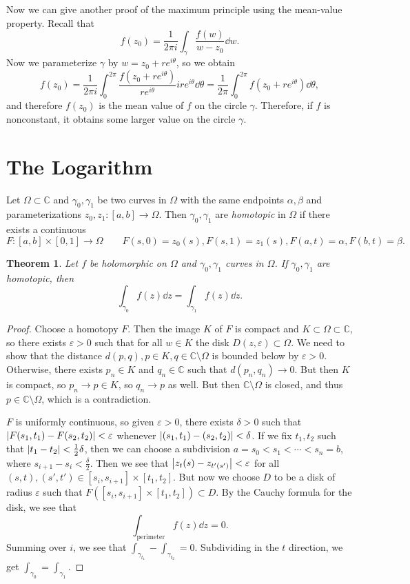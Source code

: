 \documentclass[leqno, openany]{memoir}
\newtheorem{thm}{Theorem}[section]
\theoremstyle{definition}
\theoremstyle{remark}
\theoremstyle{plain}
\theoremstyle{definition}
\theoremstyle{remark}
\newcommand{\C}{\mathbb{C}}
\newcommand{\ep}{\varepsilon}
\begin{document}
Now we can give another proof of the maximum principle using the mean-value
property. Recall that \[ f(z_0) = \frac{1}{2 \pi i} \int_{\gamma}
\frac{f(w)}{w-z_0} \dd{w}. \] Now we parameterize $\gamma$ by $w = z_0 + re^{i
\theta}$, so we obtain \[ f(z_0) = \frac{1}{2 \pi i} \int_0^{2 \pi} \frac{f(z_0
+ re^{i\theta})}{re^{i\theta}} ire^{i\theta} \dd{\theta} = \frac{1}{2\pi}
\int_0^{2 \pi} f(z_0 + re^{i\theta}) \dd{\theta}, \] and therefore $f(z_0)$ is
the mean value of $f$ on the circle $\gamma$. Therefore, if $f$ is nonconstant,
it obtains some larger value on the circle $\gamma$.

\section{The Logarithm}%

Let $\Omega \subset \C$ and $\gamma_0, \gamma_1$ be two curves in $\Omega$ with
the same endpoints $\alpha, \beta$ and parameterizations $z_0, z_1 \colon [a,b]
\to \Omega$. Then $\gamma_0, \gamma_1$ are \textit{homotopic} in $\Omega$ if
there exists a continuous \[ F \colon [a,b] \times [0,1] \to \Omega \qquad
F(s,0) = z_0(s), F(s,1) = z_1(s), F(a,t) = \alpha, F(b,t) = \beta. \]

\begin{thm} Let $f$ be holomorphic on $\Omega$ and $\gamma_0, \gamma_1$ curves
    in $\Omega$. If $\gamma_0, \gamma_1$ are homotopic, then \[ \int_{\gamma_0}
    f(z) \dd{z} = \int_{\gamma_1} f(z) \dd{z}. \] \end{thm}

\begin{proof} Choose a homotopy $F$. Then the image $K$ of $F$ is compact and
    $K \subset \Omega \subset \C$, so there exists $\ep > 0$ such that for all
    $w \in K$ the disk $D(z, \ep) \subset \Omega$. We need to show that the
    distance $d(p,q), p \in K, q \in \C \setminus \Omega$ is bounded below by
    $\ep > 0$. Otherwise, there exists $p_n \in K$ and $q_n \in \C$ such that
    $d(p_n, q_n) \to 0$. But then $K$ is compact, so $p_n \to p \in K$, so $q_n
    \to p$ as well. But then $\C \setminus \Omega$ is closed, and thus $p \in
    \C \setminus \Omega$, which is a contradiction.

    $F$ is uniformly continuous, so given $\ep > 0$, there exists $\delta > 0$
    such that $\abs{F(s_1,t_1) - F(s_2, t_2)} < \ep$ whenever $\abs{(s_1,t_1) -
    (s_2,t_2)} < \delta$. If we fix $t_1, t_2$ such that $\abs{t_1 - t_2} <
    \frac{1}{2} \delta$, then we can choose a subdivision $a = s_0 < s_1 <
    \cdots < s_n = b$, where $s_{i+1} - s_i < \frac{\delta}{2}$. Then we see
    that $\abs{z_t(s) - z_{t'(s')}} < \ep$ for all $(s,t), (s',t') \in [s_i,
    s_{i+1}] \times [t_1, t_2]$. But now we choose $D$ to be a disk of radius
    $\ep$ such that $F([s_i, s_{i+1}] \times [t_1, t_2]) \subset D$. By the
    Cauchy formula for the disk, we see that \[ \int_{\text{perimeter}} f(z)
    \dd{z} = 0. \] Summing over $i$, we see that $\int_{\gamma_{t_1}} -
\int_{\gamma_{t_2}} = 0$. Subdividing in the $t$ direction, we get
$\int_{\gamma_0} = \int_{\gamma_1}$.  \end{proof}
\end{document}
